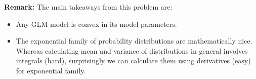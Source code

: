 \begin{enumerate}
    

\ifnum{}\fi

    

\ifnum{}\fi


    

\ifnum{}\fi


\end{enumerate}

\textbf{Remark:} The main takeaways from this problem are:
\begin{itemize}
  \item Any GLM model is convex in its model parameters.
  \item The exponential family of probability distributions are mathematically
  nice. Whereas calculating mean and variance of distributions in general
  involves integrals (hard), surprisingly we can calculate them using
  derivatives (easy) for exponential family.
\end{itemize}
